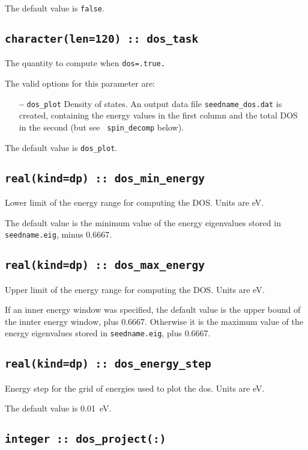 The default value is \verb#false#.


\subsection[dos\_task]{\tt character(len=120) ::  dos\_task}
The quantity to compute when {\tt dos=.true.}

The valid options for this parameter are:
\begin{itemize}
\item[{\bf --}] \verb#dos_plot# Density of states. An output data file
  {\tt seedname\_dos.dat} is created, containing the energy values in
  the first column and the total DOS in the second (but see {\tt
    spin\_decomp} below).
\end{itemize}


The default value is \verb#dos_plot#.


\subsection[dos\_min\_energy]{\tt real(kind=dp) :: dos\_min\_energy}
Lower limit of the energy range for computing the DOS.
Units are eV.

The default value is the minimum value of the energy eigenvalues
stored in {\tt seedname.eig}, minus 0.6667.

\subsection[dos\_max\_energy]{\tt real(kind=dp) :: dos\_max\_energy}
Upper limit of the energy range for computing the DOS.
Units are eV.

If an inner energy window was specified, 
the default value is the upper bound of the innter energy window, plus 0.6667.
Otherwise it is  the maximum value of the energy eigenvalues
stored in {\tt seedname.eig}, plus 0.6667.

\subsection[dos\_energy\_step]{\tt real(kind=dp) :: dos\_energy\_step}
Energy step for the grid of energies used to plot the dos. Units are eV.

The default value is 0.01~eV.

\subsection[dos\_project]{\tt integer :: dos\_project(:)}

